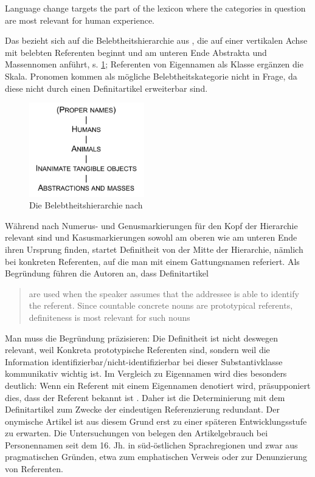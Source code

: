 \begin{exe}
	\ex \label{ex:enger} Language change targets the part of the lexicon where the categories in question are most relevant for human experience.
	\end{exe}
\noindent
Das  bezieht sich auf die Belebtheitshierarchie aus , die auf einer vertikalen Achse mit belebten Referenten beginnt und am unteren Ende Abstrakta und Massennomen anführt, s. \ref{enger};  Referenten von Eigennamen als  Klasse ergänzen die Skala. Pronomen kommen als mögliche Belebtheitskategorie nicht in Frage, da diese nicht durch einen Definitartikel erweiterbar sind. 

\begin{figure}[h]
\begin{center}
\includegraphics[width=5cm]{images/enger-hierarchie.jpg}
\caption {Die Belebtheitshierarchie nach \textcite{Enger2011}}
\label{enger}
\end{center}
\end{figure} 
	

Während nach \textcite[206ff.]{Enger2011} Numerus- und Genusmarkierungen für den Kopf der Hierarchie relevant sind und Kasusmarkierungen sowohl am oberen wie am unteren Ende ihren Ursprung finden, startet Definitheit von der Mitte der Hierarchie, nämlich bei konkreten Referenten, auf die man mit einem Gattungsnamen referiert.  Als Begründung führen die Autoren an, dass Definitartikel \blockcquote[205]{Enger2011}[.]{are used when the speaker assumes that the addressee is able to identify the referent. Since countable concrete nouns are prototypical referents, definiteness is most relevant for such nouns}. Man muss die Begründung präzisieren: Die Definitheit ist nicht deswegen relevant, weil Konkreta prototypische Referenten sind, sondern weil die Information identifizierbar/nicht-identifizierbar bei dieser Substantivklasse kommunikativ wichtig ist. Im Vergleich zu Eigennamen wird dies besonders deutlich: Wenn ein Referent mit einem Eigennamen denotiert wird, präsupponiert dies, dass der Referent bekannt ist \parencite[997]{Heim2011}. Daher ist die Determinierung mit dem Definitartikel zum Zwecke der eindeutigen Referenzierung redundant. Der onymische Artikel ist aus diesem Grund erst zu einer späteren Entwicklungsstufe zu erwarten. Die Untersuchungen von \textcite{Schmuck2014,Schmuck2020} belegen den Artikelgebrauch bei Personennamen seit dem 16. Jh. in süd-östlichen Sprachregionen und zwar aus pragmatischen Gründen, etwa zum emphatischen Verweis oder zur Denunzierung von Referenten.

